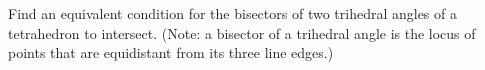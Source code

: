 Find an equivalent condition for the bisectors of two trihedral angles of a tetrahedron to intersect. \newline
(Note: a bisector of a trihedral angle is the locus of points
that are equidistant from its three line edges.)
